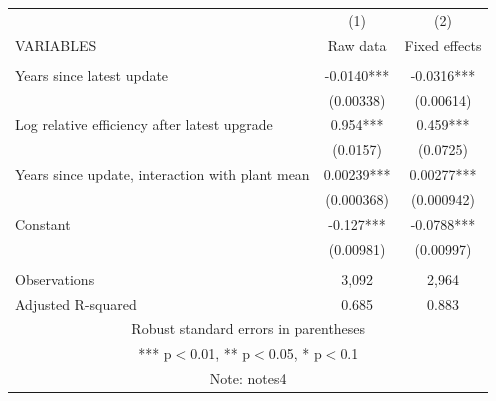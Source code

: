 \begin{tabular}{lcc} \hline
\scriptsize
 & (1) & (2) \\
VARIABLES & Raw data & Fixed effects \\ \hline
 &  &  \\
Years since latest update & -0.0140*** & -0.0316*** \\
 & (0.00338) & (0.00614) \\
Log relative efficiency after latest upgrade & 0.954*** & 0.459*** \\
 & (0.0157) & (0.0725) \\
Years since update, interaction with plant mean & 0.00239*** & 0.00277*** \\
 & (0.000368) & (0.000942) \\
Constant & -0.127*** & -0.0788*** \\
 & (0.00981) & (0.00997) \\
 &  &  \\
Observations & 3,092 & 2,964 \\
 Adjusted R-squared & 0.685 & 0.883 \\ \hline
\multicolumn{3}{c}{ Robust standard errors in parentheses} \\
\multicolumn{3}{c}{ *** p$<$0.01, ** p$<$0.05, * p$<$0.1} \\
\multicolumn{3}{c}{ Note: notes4} \\
\end{tabular}
